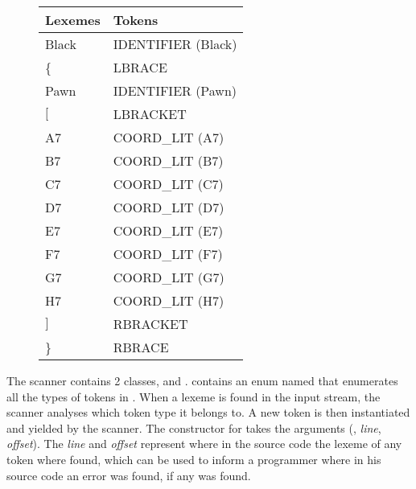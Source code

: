 \begin{figure}
\begin{tabular}{|l|l|}
        \hline
        Lexemes & Tokens             \\ \hline
        Black   & IDENTIFIER (Black) \\ 
        \{       & LBRACE             \\ 
        Pawn    & IDENTIFIER (Pawn)  \\ 
        $[$       & LBRACKET           \\ 
        A7      & COORD\_LIT (A7)     \\ 
        B7      & COORD\_LIT (B7)     \\ 
        C7      & COORD\_LIT (C7)     \\ 
        D7      & COORD\_LIT (D7)     \\ 
        E7      & COORD\_LIT (E7)     \\ 
        F7      & COORD\_LIT (F7)     \\ 
        G7      & COORD\_LIT (G7)     \\ 
        H7      & COORD\_LIT (H7)     \\ 
        $]$       & RBRACKET           \\ 
        \}       & RBRACE             \\
        \hline
\end{tabular}
\label{table:lexemestotokens}
\end{figure}

The scanner contains 2 classes,  and .  contains an enum named  that enumerates all the types of tokens in \productname{}. When a lexeme is found in the input stream, the scanner analyses which token type it belongs to. A new token is then instantiated and yielded by the scanner. The constructor for  takes the arguments (, \textit{line}, \textit{offset}). The \textit{line} and \textit{offset} represent where in the source code the lexeme of any token where found, which can be used to inform a programmer where in his source code an error was found, if any was found.
 
